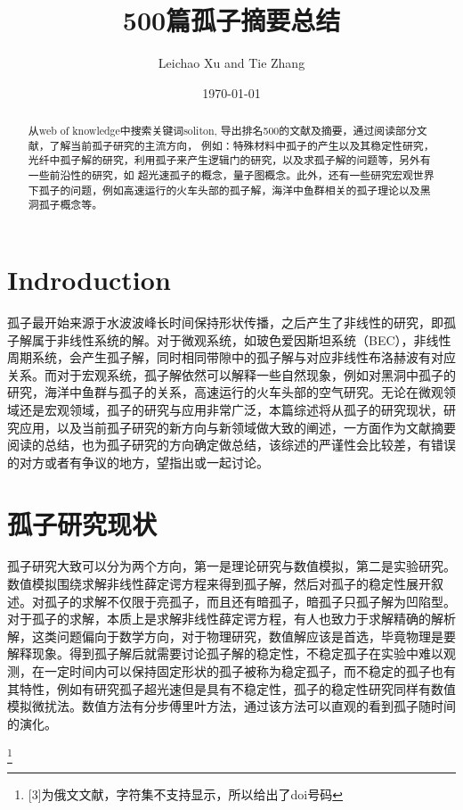 \documentclass{article}
\begin{document}
\title{500篇孤子摘要总结}

\author{Leichao Xu and Tie Zhang}

\date{\today}



\maketitle
\begin{abstract}
从web of knowledge中搜索关键词soliton, 导出排名500的文献及摘要，通过阅读部分文献，了解当前孤子研究的主流方向，
例如：特殊材料中孤子的产生以及其稳定性研究，光纤中孤子解的研究，利用孤子来产生逻辑门的研究，以及求孤子解的问题等，另外有一些前沿性的研究，如
超光速孤子的概念，量子图概念。此外，还有一些研究宏观世界下孤子的问题，例如高速运行的火车头部的孤子解，海洋中鱼群相关的孤子理论以及黑洞孤子概念等。
\end{abstract}
\begin{multicols}{2}
\section{Indroduction}
孤子最开始来源于水波波峰长时间保持形状传播，之后产生了非线性的研究，即孤子解属于非线性系统的解。对于微观系统，如玻色爱因斯坦系统（BEC），非线性周期系统，会产生孤子解，同时相同带隙中的孤子解与对应非线性布洛赫波有对应关系\cite{Zhang.2009}。而对于宏观系统，孤子解依然可以解释一些自然现象，例如对黑洞中孤子的研究\cite{dymnikova2020regular}，海洋中鱼群与孤子的关系\cite{soliton_russion}，高速运行的火车头部的空气研究\cite{soliton_russion}。无论在微观领域还是宏观领域，孤子的研究与应用非常广泛，本篇综述将从孤子的研究现状，研究应用，以及当前孤子研究的新方向与新领域做大致的阐述，一方面作为文献摘要阅读的总结，也为孤子研究的方向确定做总结，该综述的严谨性会比较差，有错误的对方或者有争议的地方，望指出或一起讨论。

\section{孤子研究现状}
孤子研究大致可以分为两个方向，第一是理论研究与数值模拟，第二是实验研究。数值模拟围绕求解非线性薛定谔方程来得到孤子解，然后对孤子的稳定性展开叙述。对孤子的求解不仅限于亮孤子，而且还有暗孤子，暗孤子只孤子解为凹陷型。对于孤子的求解，本质上是求解非线性薛定谔方程，有人也致力于求解精确的解析解\cite{2020Exact,inproceedings}，这类问题偏向于数学方向，对于物理研究，数值解应该是首选，毕竟物理是要解释现象。得到孤子解后就需要讨论孤子解的稳定性，不稳定孤子在实验中难以观测，在一定时间内可以保持固定形状的孤子被称为稳定孤子，而不稳定的孤子也有其特性，例如有研究孤子超光速但是具有不稳定性\cite{1937-1632_2020_8_2285}，孤子的稳定性研究同样有数值模拟微扰法。数值方法有分步傅里叶方法，通过该方法可以直观的看到孤子随时间的演化。
\end{multicols}

%


\footnote{[3]为俄文文献，字符集不支持显示，所以给出了doi号码} 
\end{document}

